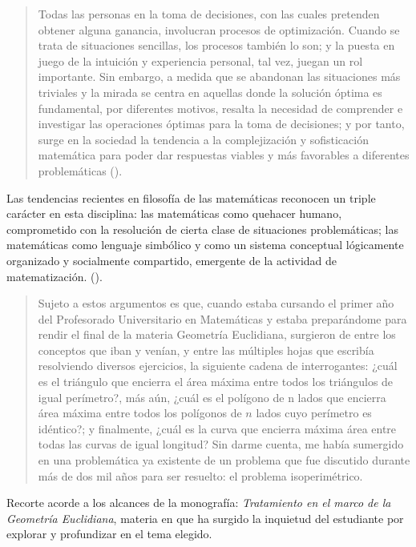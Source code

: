 \begin{quote}
	Todas las personas en la toma de decisiones, con las cuales pretenden obtener alguna ganancia, involucran procesos de optimización. Cuando se trata de situaciones sencillas, los procesos también lo son; y la puesta en juego de la intuición y experiencia personal, tal vez, juegan un rol importante. Sin embargo, a medida que se abandonan las situaciones más triviales y la mirada se centra en aquellas donde la solución óptima es fundamental, por diferentes motivos, resalta la necesidad de comprender e investigar las operaciones óptimas para la toma de decisiones; y por tanto, surge en la sociedad la tendencia a la complejización y sofisticación matemática para poder dar respuestas viables y más favorables a diferentes problemáticas (\textcite{hernandez2011,zavala2014}).
\end{quote}
\vspace{1em}

Las tendencias recientes en filosofía de las matemáticas reconocen un triple carácter en esta disciplina: las matemáticas como quehacer humano, comprometido con la resolución de cierta clase de situaciones problemáticas; las matemáticas como lenguaje simbólico y como un sistema conceptual lógicamente organizado y socialmente compartido, emergente de la actividad de matematización. (\textcite{godino2003}).

\vspace{1em}
\begin{quote}
	Sujeto a estos argumentos es que, cuando estaba cursando el primer año del Profesorado Universitario en Matemáticas y estaba preparándome para rendir el final de la materia Geometría Euclidiana, surgieron de entre los conceptos que iban y venían, y entre las múltiples hojas que escribía resolviendo diversos ejercicios, la siguiente cadena de interrogantes: ¿cuál es el triángulo que encierra el área máxima entre todos los triángulos de igual perímetro?, más aún, ¿cuál es el polígono de n lados que encierra área máxima entre todos los polígonos de $n$ lados cuyo perímetro es idéntico?; y finalmente, ¿cuál es la curva que encierra máxima área entre todas las curvas de igual longitud? Sin darme cuenta, me había sumergido en una problemática ya existente de un problema que fue discutido durante más de dos mil años para ser resuelto: el problema isoperimétrico.
\end{quote}
\vspace{1em}

Recorte acorde a los alcances de la monografía: \textit{Tratamiento en el marco de la Geometría Euclidiana}, materia en que ha surgido la inquietud del estudiante por explorar y profundizar en el tema elegido.

